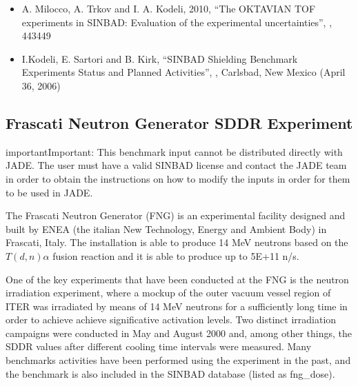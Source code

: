 \documentclass[letterpaper,10pt,english]{sphinxmanual}
\begin{document}
\nopagebreak


\sphinxAtStartPar
{}
\begin{itemize}
\item {} 
\sphinxAtStartPar
A. Milocco, A. Trkov and I. A. Kodeli, 2010, “The OKTAVIAN TOF experiments in SINBAD: Evaluation of the
experimental uncertainties”, ,  443\sphinxhyphen{}449

\item {} 
\sphinxAtStartPar
I.Kodeli, E. Sartori and B. Kirk, “SINBAD \sphinxhyphen{} Shielding Benchmark Experiments \sphinxhyphen{} Status and Planned Activities”,
,
Carlsbad, New Mexico (April 3\sphinxhyphen{}6, 2006)

\end{itemize}




\subsection{Frascati Neutron Generator SDDR Experiment}
\label{\detokenize{usage/benchmarks:frascati-neutron-generator-sddr-experiment}}
\begin{sphinxadmonition}{important}{Important:}
\sphinxAtStartPar
This benchmark input cannot be distributed directly with JADE. The user must have a valid SINBAD
license and contact the JADE team in order to obtain the instructions on how to modify
the inputs in order for them to be used in JADE.
\end{sphinxadmonition}

\sphinxAtStartPar
The Frascati Neutron Generator (FNG) is an experimental facility designed and built by ENEA
(the italian New Technology, Energy and Ambient Body) in Frascati, Italy. The installation
is able to produce 14 MeV neutrons based on the $T(d,n)\alpha$ fusion reaction and it is able to
produce up to 5E+11 n/s.

\sphinxAtStartPar
One of the key experiments that have been conducted at the FNG is the neutron irradiation
experiment, where a mock\sphinxhyphen{}up of the outer vacuum vessel region of ITER was irradiated by
means of 14 MeV neutrons for a sufficiently long time in order to achieve achieve significative
activation levels. Two
distinct irradiation campaigns were conducted in May and August 2000 and, among other
things, the SDDR values after different cooling time intervals were measured.
Many benchmarks activities have been performed using the experiment in the past, and the
benchmark is also included in the SINBAD database (listed as fng\_dose).
\end{document}
